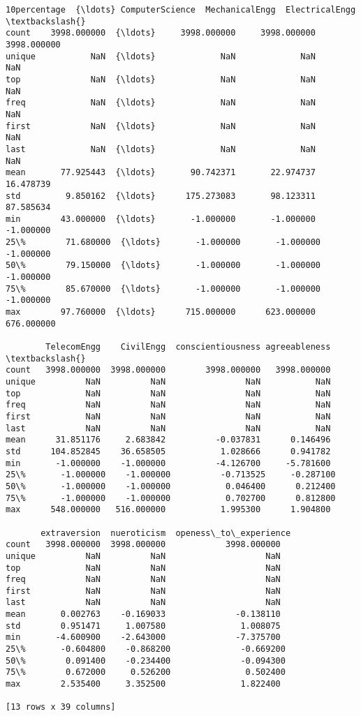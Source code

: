\documentclass[11pt]{article}
\begin{document}
\begin{tcolorbox}[breakable, size=fbox, boxrule=.5pt, pad at break*=1mm, opacityfill=0]
\begin{Verbatim}[commandchars=\\\{\}]
        10percentage  {\ldots} ComputerScience  MechanicalEngg  ElectricalEngg  \textbackslash{}
count    3998.000000  {\ldots}     3998.000000     3998.000000     3998.000000
unique           NaN  {\ldots}             NaN             NaN             NaN
top              NaN  {\ldots}             NaN             NaN             NaN
freq             NaN  {\ldots}             NaN             NaN             NaN
first            NaN  {\ldots}             NaN             NaN             NaN
last             NaN  {\ldots}             NaN             NaN             NaN
mean       77.925443  {\ldots}       90.742371       22.974737       16.478739
std         9.850162  {\ldots}      175.273083       98.123311       87.585634
min        43.000000  {\ldots}       -1.000000       -1.000000       -1.000000
25\%        71.680000  {\ldots}       -1.000000       -1.000000       -1.000000
50\%        79.150000  {\ldots}       -1.000000       -1.000000       -1.000000
75\%        85.670000  {\ldots}       -1.000000       -1.000000       -1.000000
max        97.760000  {\ldots}      715.000000      623.000000      676.000000

        TelecomEngg    CivilEngg  conscientiousness agreeableness  \textbackslash{}
count   3998.000000  3998.000000        3998.000000   3998.000000
unique          NaN          NaN                NaN           NaN
top             NaN          NaN                NaN           NaN
freq            NaN          NaN                NaN           NaN
first           NaN          NaN                NaN           NaN
last            NaN          NaN                NaN           NaN
mean      31.851176     2.683842          -0.037831      0.146496
std      104.852845    36.658505           1.028666      0.941782
min       -1.000000    -1.000000          -4.126700     -5.781600
25\%       -1.000000    -1.000000          -0.713525     -0.287100
50\%       -1.000000    -1.000000           0.046400      0.212400
75\%       -1.000000    -1.000000           0.702700      0.812800
max      548.000000   516.000000           1.995300      1.904800

       extraversion  nueroticism  openess\_to\_experience
count   3998.000000  3998.000000            3998.000000
unique          NaN          NaN                    NaN
top             NaN          NaN                    NaN
freq            NaN          NaN                    NaN
first           NaN          NaN                    NaN
last            NaN          NaN                    NaN
mean       0.002763    -0.169033              -0.138110
std        0.951471     1.007580               1.008075
min       -4.600900    -2.643000              -7.375700
25\%       -0.604800    -0.868200              -0.669200
50\%        0.091400    -0.234400              -0.094300
75\%        0.672000     0.526200               0.502400
max        2.535400     3.352500               1.822400

[13 rows x 39 columns]
\end{Verbatim}
\end{tcolorbox}
        
\end{document}
